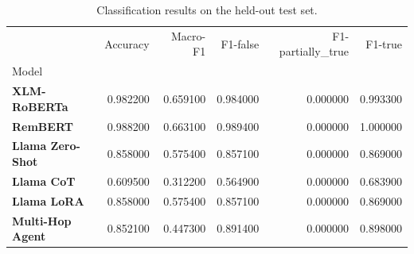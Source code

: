 \begin{table}
\caption{Classification results on the held-out test set.}
\label{tab:classification_results}
\begin{tabular}{lrrrrr}
\toprule
 & Accuracy & Macro-F1 & F1-false & F1-partially_true & F1-true \\
Model &  &  &  &  &  \\
\midrule
\textbf{XLM-RoBERTa} & 0.982200 & 0.659100 & 0.984000 & 0.000000 & 0.993300 \\
\textbf{RemBERT} & 0.988200 & 0.663100 & 0.989400 & 0.000000 & 1.000000 \\
\textbf{Llama Zero-Shot} & 0.858000 & 0.575400 & 0.857100 & 0.000000 & 0.869000 \\
\textbf{Llama CoT} & 0.609500 & 0.312200 & 0.564900 & 0.000000 & 0.683900 \\
\textbf{Llama LoRA} & 0.858000 & 0.575400 & 0.857100 & 0.000000 & 0.869000 \\
\textbf{Multi-Hop Agent} & 0.852100 & 0.447300 & 0.891400 & 0.000000 & 0.898000 \\
\bottomrule
\end{tabular}
\end{table}
